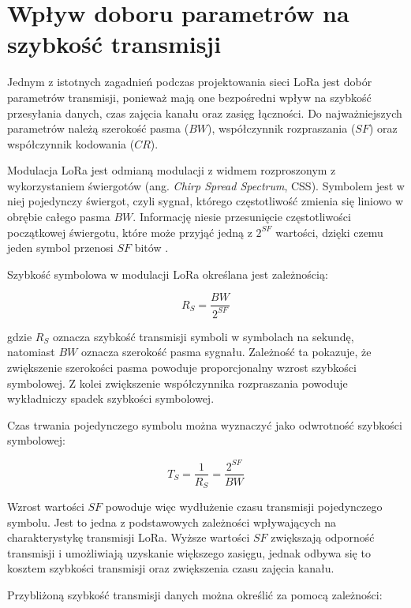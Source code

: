 \documentclass[12pt,a4paper,twoside]{report}
\theoremstyle{definition} %
\begin{document}
\section{Wpływ doboru parametrów na szybkość transmisji}

Jednym z istotnych zagadnień podczas projektowania sieci LoRa jest dobór parametrów transmisji, ponieważ mają one bezpośredni wpływ na szybkość przesyłania danych, czas zajęcia kanału oraz zasięg łączności. Do najważniejszych parametrów należą szerokość pasma (\(BW\)), współczynnik rozpraszania (\(SF\)) oraz współczynnik kodowania (\(CR\)).

Modulacja LoRa jest odmianą modulacji z widmem rozproszonym z wykorzystaniem świergotów (ang. \textit{Chirp Spread Spectrum}, CSS). Symbolem jest w niej pojedynczy świergot, czyli sygnał, którego częstotliwość zmienia się liniowo w obrębie całego pasma \(BW\). Informację niesie przesunięcie częstotliwości początkowej świergotu, które może przyjąć jedną z \(2^{SF}\) wartości, dzięki czemu jeden symbol przenosi \(SF\) bitów \cite{semtech_an1200_22}.

Szybkość symbolowa w modulacji LoRa określana jest zależnością:

	\begin{equation}\label{R_S}
        R_S = \frac{BW}{2^{SF}}
    \end{equation}

gdzie \(R_S\) oznacza szybkość transmisji symboli w symbolach na sekundę, natomiast \(BW\) oznacza szerokość pasma sygnału. Zależność ta pokazuje, że zwiększenie szerokości pasma powoduje proporcjonalny wzrost szybkości symbolowej. Z kolei zwiększenie współczynnika rozpraszania powoduje wykładniczy spadek szybkości symbolowej.

Czas trwania pojedynczego symbolu można wyznaczyć jako odwrotność szybkości symbolowej:

	\begin{equation}\label{T_S}
        T_S = \frac{1}{R_S} = \frac{2^{SF}}{BW}
    \end{equation}

Wzrost wartości \(SF\) powoduje więc wydłużenie czasu transmisji pojedynczego symbolu. Jest to jedna z podstawowych zależności wpływających na charakterystykę transmisji LoRa. Wyższe wartości \(SF\) zwiększają odporność transmisji i umożliwiają uzyskanie większego zasięgu, jednak odbywa się to kosztem szybkości transmisji oraz zwiększenia czasu zajęcia kanału.

Przybliżoną szybkość transmisji danych można określić za pomocą zależności:
\end{document}

